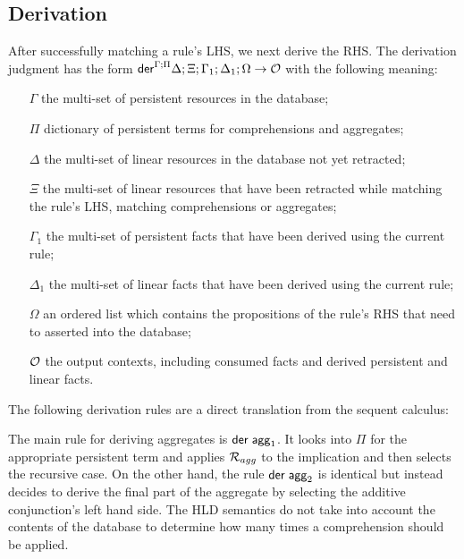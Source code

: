 

\subsection{Derivation}

After successfully matching a rule's LHS, we next derive the RHS.  The
derivation judgment has the form
$\mathsf{der}^{\Gamma ; \Pi} \Delta ; \Xi; \Gamma_1; \Delta_1; \Omega \rightarrow \mathcal{O}$ with the
following meaning:

\begin{enumerate}

   \item[$\Gamma$] the multi-set of persistent resources in the database;
   
   \item[$\Pi$] dictionary of persistent terms for comprehensions and
   aggregates;

   \item[$\Delta$] the multi-set of linear resources in the database not yet
   retracted;

   \item[$\Xi$] the multi-set of linear resources that have been retracted while
   matching the rule's LHS, matching comprehensions or aggregates;

   \item[$\Gamma_1$] the multi-set of persistent facts that have been derived
   using the current rule;

   \item[$\Delta_1$] the multi-set of linear facts that have been derived using
   the current rule;


   \item[$\Omega$] an ordered list which contains the propositions of the rule's RHS
      that need to asserted into the database;

   \item[$\mathcal{O}$] the output contexts, including consumed facts and derived
   persistent and linear facts.

\end{enumerate}

The following derivation rules are a direct translation from the sequent
calculus:



The main rule for deriving aggregates is $\mathsf{der} \; \mathsf{agg}_1$. It looks into
$\Pi$ for the appropriate persistent term and applies $\mathcal{R}_{agg}$ to the
implication and then selects the recursive case. On the other hand, the rule
$\mathsf{der} \; \mathsf{agg}_2$ is identical but instead decides to derive the final part of
the aggregate by selecting the additive conjunction's left hand side. The HLD
semantics do not take into account the contents of the database to determine how
many times a comprehension should be applied.

